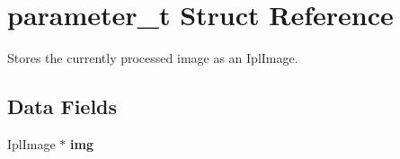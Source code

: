 \hypertarget{structparameter__t}{
\section{parameter\_\-t Struct Reference}
\label{structparameter__t}
}


Stores the currently processed image as an IplImage.  


\subsection*{Data Fields}
\begin{DoxyCompactItemize}
\item 
\hypertarget{structparameter__t_ac4ce11e5e4ba3d94f88cad6a563fe8c9}{
IplImage $\ast$ {\bfseries img}}
\label{structparameter__t_ac4ce11e5e4ba3d94f88cad6a563fe8c9}

\end{DoxyCompactItemize}
